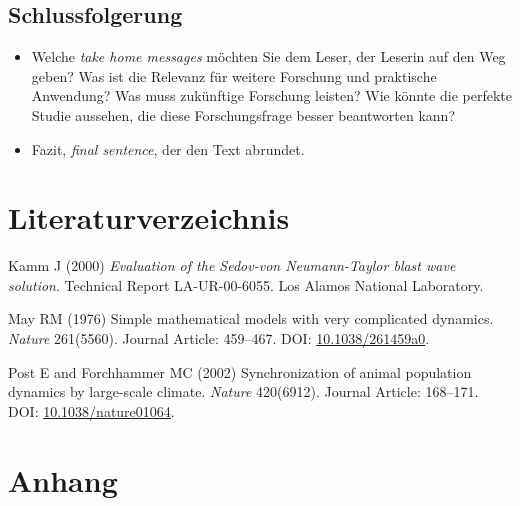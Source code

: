 \documentclass[a4paper,12pt]{article}
\providecommand{\tightlist}{%
  \setlength{\itemsep}{0pt}\setlength{\parskip}{0pt}}
\begin{document}
\hypertarget{schlussfolgerung}{%
\subsection{Schlussfolgerung}\label{schlussfolgerung}}
\begin{itemize}
\tightlist
\item
  Welche \emph{take home messages} möchten Sie dem Leser, der Leserin auf den Weg geben? Was ist die Relevanz für weitere Forschung und praktische Anwendung? Was muss zukünftige Forschung leisten? Wie könnte die perfekte Studie aussehen, die diese Forschungsfrage besser beantworten kann?
\item
  Fazit, \emph{final sentence}, der den Text abrundet.
\end{itemize}
\newpage

\hypertarget{literaturverzeichnis}{%
\section{Literaturverzeichnis}\label{literaturverzeichnis}}

\noindent

\setlength{\parindent}{-0.5cm}
\setlength{\leftskip}{0.5cm}
\setlength{\parskip}{8pt}

\hypertarget{refs}{}
\leavevmode\hypertarget{ref-kamm2000}{}%
Kamm J (2000) \emph{Evaluation of the Sedov-von Neumann-Taylor blast wave solution}. Technical Report LA-UR-00-6055. Los Alamos National Laboratory.

\leavevmode\hypertarget{ref-May1976}{}%
May RM (1976) Simple mathematical models with very complicated dynamics. \emph{Nature} 261(5560). Journal Article: 459--467. DOI: \href{https://doi.org/10.1038/261459a0}{10.1038/261459a0}.

\leavevmode\hypertarget{ref-RN410}{}%
Post E and Forchhammer MC (2002) Synchronization of animal population dynamics by large-scale climate. \emph{Nature} 420(6912). Journal Article: 168--171. DOI: \href{https://doi.org/10.1038/nature01064}{10.1038/nature01064}.

\indent
\setlength{\parindent}{17pt}
\setlength{\leftskip}{0pt}
\setlength{\parskip}{0pt}

\newpage

\appendix

\hypertarget{anhang}{%
\section{Anhang}\label{anhang}}
\end{document}
